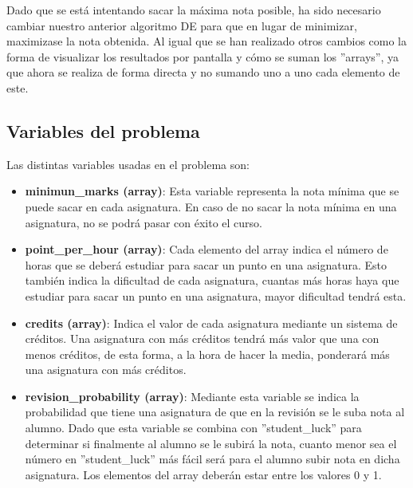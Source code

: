 \documentclass[11pt, a4paper, titlepage]{article}
\begin{document}
Dado que se está intentando sacar la máxima nota posible, ha sido necesario cambiar nuestro anterior algoritmo DE para que en lugar de minimizar, maximizase la nota obtenida. Al igual que se han realizado otros cambios como la forma de visualizar los resultados por pantalla y cómo se suman los ''arrays'', ya que ahora se realiza de forma directa y no sumando uno a uno cada elemento de este.

\subsection{Variables del problema}
Las distintas variables usadas en el problema son:

\vspace{5mm}

\begin{itemize}
\renewcommand{\labelitemi}{$\circ$}

\item \textbf{minimun\_marks (array)}: Esta variable representa la nota mínima que se puede sacar en cada asignatura. En caso de no sacar la nota mínima en una asignatura, no se podrá pasar con éxito el curso.

\vspace{5mm}

\item \textbf{point\_per\_hour (array)}: Cada elemento del array indica el número de horas que se deberá estudiar para sacar un punto en una asignatura. Esto también indica la dificultad de cada asignatura, cuantas más horas haya que estudiar para sacar un punto en una asignatura, mayor dificultad tendrá esta.

\vspace{5mm}

\item \textbf{credits (array)}: Indica el valor de cada asignatura mediante un sistema de créditos. Una asignatura con más créditos tendrá más valor que una con menos créditos, de esta forma, a la hora de hacer la media, ponderará más una asignatura con más créditos.

\vspace{5mm}

\item \textbf{revision\_probability (array)}: Mediante esta variable se indica la probabilidad que tiene una asignatura de que en la revisión se le suba nota al alumno. Dado que esta variable se combina con ''student\_luck'' para determinar si finalmente al alumno se le subirá la nota, cuanto menor sea el número en ''student\_luck'' más fácil será para el alumno subir nota en dicha asignatura. Los elementos del array deberán estar entre los valores 0 y 1.


\end{itemize}
\end{document}
